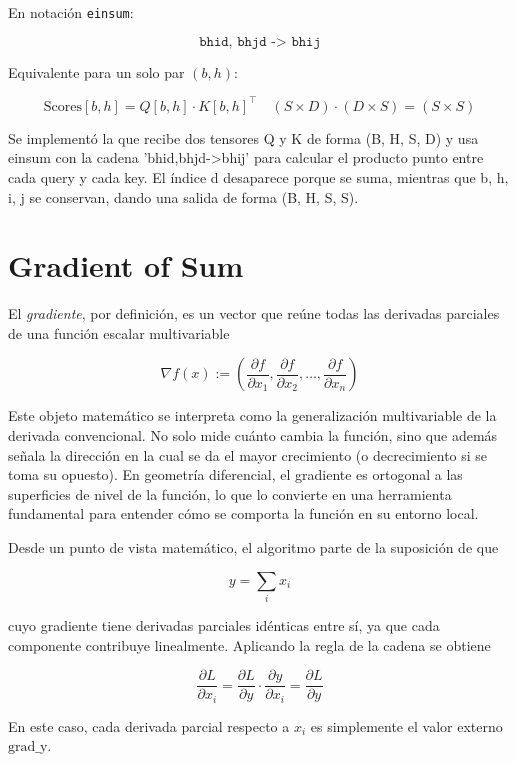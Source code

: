 \documentclass[12pt, letterpaper]{article}
\begin{document}
En notación \texttt{einsum}:

\[
\texttt{bhid, bhjd -> bhij}
\]

Equivalente para un solo par $(b, h)$:

\[
\text{Scores}[b,h] = Q[b,h] \cdot K[b,h]^\top \quad (S \times D)\cdot(D \times S) = (S \times S)
\]

Se implementó la que recibe dos tensores Q y K de forma (B, H, S, D) y usa einsum con la cadena 'bhid,bhjd->bhij' para calcular el producto punto entre 
cada query y cada key. El índice d desaparece porque se suma, mientras que b, h, i, j se conservan, dando una salida de forma (B, H, S, S).

\newpage

\section{Gradient of Sum}

El \textit{gradiente}, por definición, es un vector que reúne todas las derivadas parciales de una función escalar multivariable

\[
\nabla f(x) := \left( \frac{\partial f}{\partial x_1}, \frac{\partial f}{\partial x_2}, \dots, \frac{\partial f}{\partial x_n} \right)
\]



Este objeto matemático se interpreta como la generalización multivariable de la derivada convencional. 
No solo mide cuánto cambia la función, sino que además señala la dirección en la cual se da el mayor crecimiento 
(o decrecimiento si se toma su opuesto). En geometría diferencial, el gradiente es ortogonal a las superficies de nivel de la función, 
lo que lo convierte en una herramienta fundamental para entender cómo se comporta la función en su entorno local.

Desde un punto de vista matemático, el algoritmo parte de la suposición de que 

\[
y = \sum_i x_i
\]


cuyo gradiente tiene derivadas parciales idénticas entre sí, ya que cada componente contribuye linealmente. 
Aplicando la regla de la cadena se obtiene

\[
\frac{\partial L}{\partial x_i} = \frac{\partial L}{\partial y} \cdot \frac{\partial y}{\partial x_i} = \frac{\partial L}{\partial y}
\]



En este caso, cada derivada parcial respecto a \(x_i\) es simplemente el valor externo \(\text{grad\_y}\). 
\end{document}

